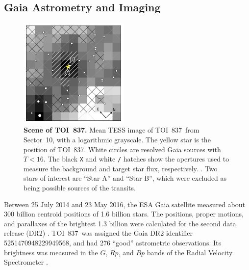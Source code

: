 \documentclass[12pt,twocolumn,tighten]{aastex63}
\newcommand{\tn}{TOI~837} %
\begin{document}
\subsection{Gaia Astrometry and Imaging}
\label{subsec:gaia}

\begin{figure}[!t]
	\begin{center}
		\leavevmode
		\includegraphics[width=0.48\textwidth]{f2.pdf}
	\end{center}
	\vspace{-0.6cm}
	\caption{ {\bf Scene of \tn.}
    Mean TESS image of \tn\ from Sector~10, with a logarithmic grayscale. The yellow star is the position of \tn.
    White circles are resolved Gaia sources with $T<16$.
    The black \texttt{X} and white \texttt{/} hatches show the
    apertures used to measure the background and target star flux,
    respectively. .  Two stars of interest are ``Star A'' and ``Star B'', which
    were excluded as being possible sources of the transits.
		\label{fig:scene}
	}
\end{figure}

Between 25 July 2014 and 23 May 2016, the ESA Gaia satellite measured
about 300 billion centroid positions of 1{.}6 billion stars.  The
positions, proper motions, and parallaxes of the brightest 1{.}3
billion were calculated for the second data release (DR2)
\citep{gaia_collaboration_gaia_2016,lindegren_gaiasoln_2018,gaia_collaboration_gaia_2018}.
\tn\ was assigned the Gaia DR2 identifier 5251470948229949568, and had
276 ``good'' astrometric observations. Its brightness was measured in
the $G$, $Rp$, and $Bp$ bands of the Radial Velocity Spectrometer
\citep{cropper_gaia_2018,evans_gaia_2018}.  
\end{document}
